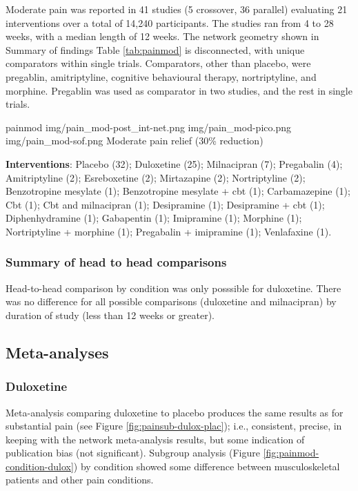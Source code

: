 \documentclass{report}\usepackage[]{graphicx}\usepackage[]{color}
\begin{document}
Moderate pain was reported in 41 studies (5 crossover, 36 parallel) evaluating 21 interventions over a total of 14,240 participants. The studies ran from 4 to 28 weeks, with a median length of 12 weeks. The network geometry shown in Summary of findings Table \ref{tab:painmod}  is disconnected, with unique comparators within single trials. Comparators, other than placebo, were pregablin, amitriptyline, cognitive behavioural therapy, nortriptyline, and morphine. Pregablin was used as comparator in two studies, and the rest in single trials.

\soffignew
{painmod}
{img/pain_mod-post_int-net.png}
{img/pain_mod-pico.png}
{img/pain_mod-sof.png}
{Moderate pain relief (30\% reduction)}

\textbf{Interventions}: Placebo (32); Duloxetine (25); Milnacipran (7); Pregabalin (4); Amitriptyline (2); Esreboxetine (2); Mirtazapine (2); Nortriptyline (2); Benzotropine mesylate (1); Benzotropine mesylate + cbt (1); Carbamazepine (1); Cbt (1); Cbt and milnacipran (1); Desipramine (1); Desipramine + cbt (1); Diphenhydramine (1); Gabapentin (1); Imipramine (1); Morphine (1); Nortriptyline + morphine (1); Pregabalin + imipramine (1); Venlafaxine (1).

\subsubsection{Summary of head to head comparisons}

Head-to-head comparison by condition was only posssible for duloxetine. There was no difference for all possible comparisons (duloxetine and milnacipran) by duration of study (less than 12 weeks or greater).

\subsection{Meta-analyses}

\subsubsection{Duloxetine}

Meta-analysis comparing duloxetine to placebo produces the same results as for substantial pain (see Figure \ref{fig:painsub-dulox-plac}); i.e., consistent, precise, in keeping with the network meta-analysis results, but some indication of publication bias (not significant). Subgroup analysis (Figure \ref{fig:painmod-condition-dulox}) by condition showed some difference between musculoskeletal patients and other pain conditions.
\end{document}
